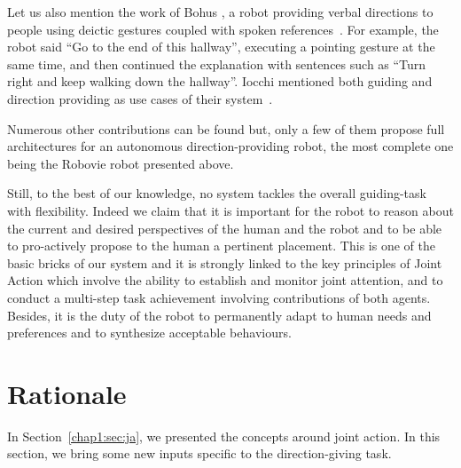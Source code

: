 \documentclass[a4paper,11pt,twoside]{StyleThese}
\begin{document}
Let us also mention the work of Bohus \etal{}, a robot providing verbal directions to people using deictic gestures coupled with spoken references~\cite{bohus_directions_2014}. For example, the robot said ``Go to the end of this hallway'', executing a pointing gesture at the same time, and then continued the explanation with sentences such as ``Turn right and keep walking down the hallway''. Iocchi \etal{} mentioned both guiding and direction providing as use cases of their system~\cite{iocchi_2015_personalized}.

Numerous other contributions can be found but,  only a few of them propose full architectures for an autonomous direction-providing robot, the most complete one being the Robovie robot presented above. 

Still, to the best of our knowledge, no system tackles the overall guiding-task with flexibility. Indeed we claim that it is important for the robot
to reason about the current and desired perspectives of the human and the robot and to be able to pro-actively propose to the human a pertinent placement. This is one of the basic bricks of our system and it is strongly linked to the key principles of Joint Action which involve the ability to establish and monitor joint attention,  and to conduct a multi-step task achievement involving contributions of both agents. Besides, it is the duty of the robot to permanently adapt to human needs and preferences and to synthesize acceptable behaviours.

\section{Rationale}\label{sec:rationale}

In Section~\ref{chap1:sec:ja}, we presented the concepts around joint action. In this section, we bring some new inputs specific to the direction-giving task. 
\end{document}
